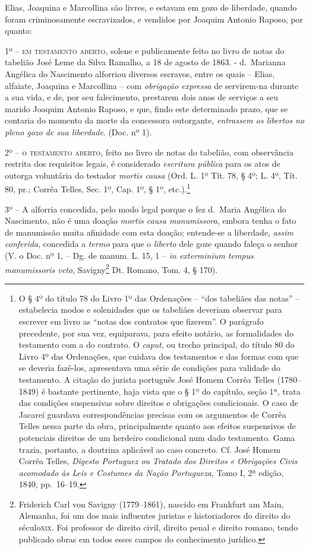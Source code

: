 {\begin{flushright}
Elias, Joaquina e Marcollina são livres, e estavam em gozo de liberdade,
quando foram criminosamente escravizados, e vendidos por Joaquim Antonio
Raposo, por quanto:

1º -- \textsc{em testamento aberto}, solene e publicamente feito no livro de
notas do tabelião José Leme da Silva Ramalho, a 18 de agosto de 1863. -
d.~Marianna Angélica do Nascimento alforriou diversos escravos, entre os
quais -- Elias, alfaiate, Joaquina e Marcollina -- com \emph{obrigação
expressa} de servirem-na durante a sua vida, e de, por seu falecimento,
prestarem dois anos de serviços a seu marido Joaquim Antonio Raposo, e
que, findo este determinado prazo, que se contaria do momento da morte
da concessora outorgante, \emph{entrassem os libertos no pleno gozo de
sua liberdade}. (Doc. nº 1).

2º -- \textsc{o testamento aberto}, feito no livro de notas do tabelião, com
observância restrita dos requisitos legais, é considerado
\emph{escritura pública} para os atos de outorga voluntária do testador
\emph{mortis causa} (Ord. L. 1º Tít. 78, § 4º; L. 4º, Tít. 80, pr.;
Corrêa Telles, Sec. 1º, Cap. 1º, § 1º, etc.).\footnote{ O § 4º do
  título 78 do Livro 1º das Ordenações -- ``dos tabeliães das notas'' --
  estabelecia modos e solenidades que os tabeliães deveriam observar
  para escrever em livro as ``notas dos contratos que fizerem''. O
  parágrafo precedente, por sua vez, equiparava, para efeito notário, as
  formalidades do testamento com a do contrato. O \emph{caput}, ou
  trecho principal, do título 80 do Livro 4º das Ordenações, que cuidava
  dos testamentos e das formas com que se deveria fazê-los, apresentava
  uma série de condições para validade do testamento. A citação do
  jurista português José Homem Corrêa Telles (1780--1849) é bastante
  pertinente, haja vista que o § 1º do capítulo, seção 1ª, trata das
  condições suspensivas sobre direitos e obrigações condicionais. O caso
  de Jacareí guardava correspondências precisas com os argumentos de
  Corrêa Telles nessa parte da obra, principalmente quanto aos efeitos
  suspensivos de potenciais direitos de um herdeiro condicional num dado
  testamento. Gama trazia, portanto, a doutrina aplicável ao caso
  concreto. Cf. José Homem Corrêa Telles, \emph{Digesto Portuguez ou
  Tratado dos Direitos e Obrigações Civis acomodado às Leis e Costumes
  da Nação Portugueza}, Tomo I, 2ª edição, 1840, pp.~16--19.}

3º -- A alforria concedida, pelo modo legal porque o fez d.~Maria
Angélica do Nascimento, não é uma doação \emph{mortis causa
manumissora}, embora tenha o fato de manumissão muita afinidade com esta
doação; entende-se a liberdade, \emph{assim conferida}, concedida a
\emph{termo} para que o \emph{liberto} dele goze quando faleça o senhor
(V. o Doc. nº 1, -- Dg. de manum. L. 15, 1 -- \emph{in exterminium
tempus manumissoris veto}, Savigny\footnote{ Friderich Carl von Savigny
  (1779--1861), nascido em Frankfurt am Main, Alemanha, foi um dos mais
  influentes juristas e historiadores do direito do século\textsc{xix}. Foi
  professor de direito civil, direito penal e direito romano, tendo
  publicado obras em todos esses campos do conhecimento jurídico.} Dt.
Romano, Tom. 4, § 170).


\end{flushright}}
